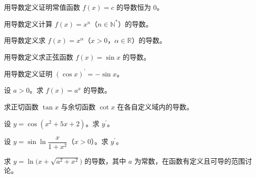 \noindent\begin{minipage}{\textwidth}
用导数定义证明常值函数 $f(x)=c$ 的导数恒为 $0$。
\end{minipage}\par\vfill
\noindent\begin{minipage}{\textwidth}
用导数定义计算 $f(x)=x^n$（$n\in\mathbb N^*$）的导数。
\end{minipage}\par\vfill
\newpage
\noindent\begin{minipage}{\textwidth}
用导数定义求 $f(x)=x^\alpha$（$x>0$，$\alpha\in\mathbb R$）的导数。
\end{minipage}\par\vfill
\noindent\begin{minipage}{\textwidth}
用导数定义求正弦函数 $f(x)=\sin x$ 的导数。
\end{minipage}\par\vfill
\noindent\begin{minipage}{\textwidth}
用导数定义证明 $(\cos x)^{\prime}=-\sin x$。
\end{minipage}\par\vfill
\newpage
\noindent\begin{minipage}{\textwidth}
设 $a>0$。求 $f(x)=a^x$ 的导数。
\end{minipage}\par\vfill
\noindent\begin{minipage}{\textwidth}
求正切函数 $\tan x$ 与余切函数 $\cot x$ 在各自定义域内的导数。
\end{minipage}\par\vfill
\noindent\begin{minipage}{\textwidth}
设 $y=\cos(x^2+5x+2)$。求 $y^{\prime}$。
\end{minipage}\par\vfill
\newpage
\noindent\begin{minipage}{\textwidth}
设 $y=\sin\ln\dfrac{x}{1+x^2}$（$x>0$）。求 $y^{\prime}$。
\end{minipage}\par\vfill
\noindent\begin{minipage}{\textwidth}
求 $y=\ln\bigl(x+\sqrt{a^2+x^2}\bigr)$ 的导数，其中 $a$ 为常数，在函数有定义且可导的范围讨论。
\end{minipage}\par\vfill
